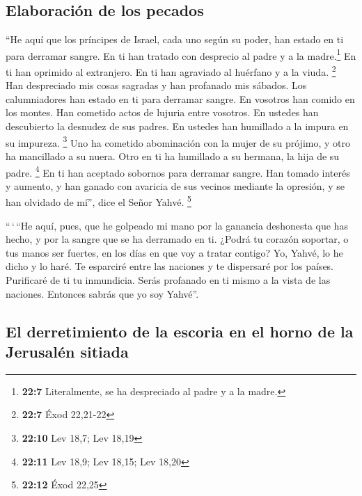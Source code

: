 \hypertarget{elaboraciuxf3n-de-los-pecados}{%
\subsection{Elaboración de los
pecados}\label{elaboraciuxf3n-de-los-pecados}}

 ``He aquí que los príncipes de Israel, cada uno según su
poder, han estado en ti para derramar sangre.  En ti han
tratado con desprecio al padre y a la madre.\footnote{\textbf{22:7}
  Literalmente, se ha despreciado al padre y a la madre.} En ti han
oprimido al extranjero. En ti han agraviado al huérfano y a la viuda.
\footnote{\textbf{22:7} Éxod 22,21-22}  Han despreciado
mis cosas sagradas y han profanado mis sábados.  Los
calumniadores han estado en ti para derramar sangre. En vosotros han
comido en los montes. Han cometido actos de lujuria entre vosotros.
 En ustedes han descubierto la desnudez de sus padres. En
ustedes han humillado a la impura en su impureza. \footnote{\textbf{22:10}
  Lev 18,7; Lev 18,19}  Uno ha cometido abominación con
la mujer de su prójimo, y otro ha mancillado a su nuera. Otro en ti ha
humillado a su hermana, la hija de su padre. \footnote{\textbf{22:11}
  Lev 18,9; Lev 18,15; Lev 18,20}  En ti han aceptado
sobornos para derramar sangre. Han tomado interés y aumento, y han
ganado con avaricia de sus vecinos mediante la opresión, y se han
olvidado de mí'', dice el Señor Yahvé. \footnote{\textbf{22:12} Éxod
  22,25}

 ``\,`\,``He aquí, pues, que he golpeado mi mano por la
ganancia deshonesta que has hecho, y por la sangre que se ha derramado
en ti.  ¿Podrá tu corazón soportar, o tus manos ser
fuertes, en los días en que voy a tratar contigo? Yo, Yahvé, lo he dicho
y lo haré.  Te esparciré entre las naciones y te
dispersaré por los países. Purificaré de ti tu inmundicia.
 Serás profanado en ti mismo a la vista de las naciones.
Entonces sabrás que yo soy Yahvé''.

\hypertarget{el-derretimiento-de-la-escoria-en-el-horno-de-la-jerusaluxe9n-sitiada}{%
\subsection{El derretimiento de la escoria en el horno de la Jerusalén
sitiada}\label{el-derretimiento-de-la-escoria-en-el-horno-de-la-jerusaluxe9n-sitiada}}


